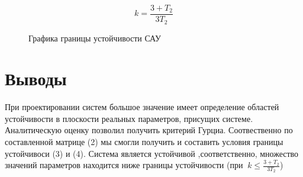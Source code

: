 \documentclass[a4paper, 12pt]{article}
\begin{document}
\begin{equation}
k =\frac{3 + T_2}{3T_2}
\end{equation}
\newpage
\begin{figure}[h]
	\caption{Графика границы устойчивости САУ}
\end{figure}

\newpage

	\section*{\centering Выводы}

При проектировании систем большое значение имеет определение областей устойчивости в плоскости реальных параметров, присущих системе. Аналитическую оценку позволил получить критерий Гурциа. Соотвественно по составленной матрице (2) мы смогли получить и составить условия границы устойчивоси (3) и (4). Система является устойчивой ,соответственно, множество значений параметров находится ниже границы устойчивости (при %
$\ k \le \frac{{3 + {T_2}}}{{3{T_2}}}$)
\end{document}
